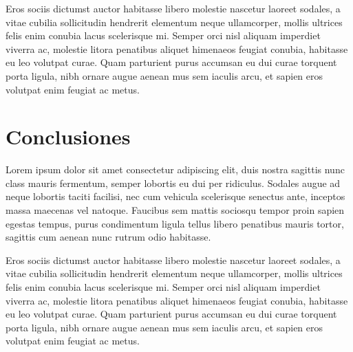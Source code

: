 \documentclass{article}
\begin{document}
Eros sociis dictumst auctor habitasse libero molestie nascetur laoreet sodales, a vitae cubilia sollicitudin hendrerit elementum neque ullamcorper, mollis ultrices felis enim conubia lacus scelerisque mi. Semper orci nisl aliquam imperdiet viverra ac, molestie litora penatibus aliquet himenaeos feugiat conubia, habitasse eu leo volutpat curae. Quam parturient purus accumsan eu dui curae torquent porta ligula, nibh ornare augue aenean mus sem iaculis arcu, et sapien eros volutpat enim feugiat ac metus.
\newpage

\section{Conclusiones}
Lorem ipsum dolor sit amet consectetur adipiscing elit, duis nostra sagittis nunc class mauris fermentum, semper lobortis eu dui per ridiculus. Sodales augue ad neque lobortis taciti facilisi, nec cum vehicula scelerisque senectus ante, inceptos massa maecenas vel natoque. Faucibus sem mattis sociosqu tempor proin sapien egestas tempus, purus condimentum ligula tellus libero penatibus mauris tortor, sagittis cum aenean nunc rutrum odio habitasse.

Eros sociis dictumst auctor habitasse libero molestie nascetur laoreet sodales, a vitae cubilia sollicitudin hendrerit elementum neque ullamcorper, mollis ultrices felis enim conubia lacus scelerisque mi. Semper orci nisl aliquam imperdiet viverra ac, molestie litora penatibus aliquet himenaeos feugiat conubia, habitasse eu leo volutpat curae. Quam parturient purus accumsan eu dui curae torquent porta ligula, nibh ornare augue aenean mus sem iaculis arcu, et sapien eros volutpat enim feugiat ac metus.
\newpage
\end{document}
